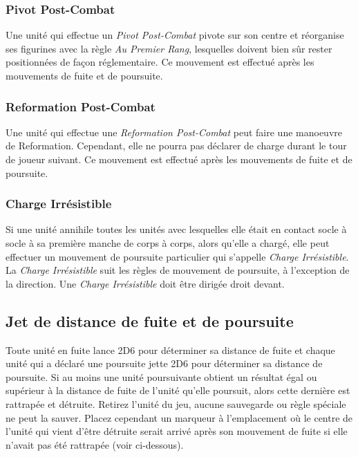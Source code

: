 \subsubsection*{Pivot Post-Combat}
Une unité qui effectue un \emph{Pivot Post-Combat} pivote sur son centre et réorganise ses figurines avec la règle \emph{Au Premier Rang}, lesquelles doivent bien sûr rester positionnées de façon réglementaire. Ce mouvement est effectué après les mouvements de fuite et de poursuite.

\subsubsection*{Reformation Post-Combat}
Une unité qui effectue une \emph{Reformation Post-Combat} peut faire une manoeuvre de Reformation. Cependant, elle ne pourra pas déclarer de charge durant le tour de joueur suivant. Ce mouvement est effectué après les mouvements de fuite et de poursuite.

\subsubsection*{Charge Irrésistible}
Si une unité annihile toutes les unités avec lesquelles elle était en contact socle à socle à sa première manche de corps à corps, alors qu'elle a chargé, elle peut effectuer un mouvement de poursuite particulier qui s'appelle \emph{Charge Irrésistible}. La \emph{Charge Irrésistible} suit les règles de mouvement de poursuite, à l'exception de la direction. Une \emph{Charge Irrésistible} doit être dirigée droit devant.

\subsection*{Jet de distance de fuite et de poursuite}

Toute unité en fuite lance 2D6 pour déterminer sa distance de fuite et chaque unité qui a déclaré une poursuite jette 2D6 pour déterminer sa distance de poursuite. Si au moins une unité poursuivante obtient un résultat égal ou supérieur à la distance de fuite de l'unité qu'elle poursuit, alors cette dernière est rattrapée et détruite. Retirez l'unité du jeu, aucune sauvegarde ou règle spéciale ne peut la sauver. Placez cependant un marqueur à l'emplacement où le centre de l'unité qui vient d'être détruite serait arrivé après son mouvement de fuite si elle n'avait pas été rattrapée (voir ci-dessous).

